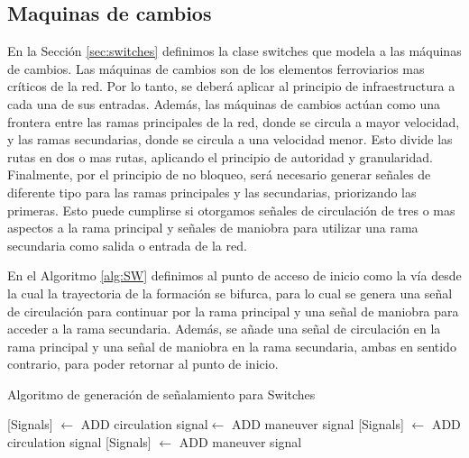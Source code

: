 \subsection{Maquinas de cambios}

    
    En la Sección \ref{sec:switches} definimos la clase switches que modela a las máquinas de cambios. Las máquinas de cambios son de los elementos ferroviarios mas críticos de la red. Por lo tanto, se deberá aplicar al principio de infraestructura a cada una de sus entradas. Además, las máquinas de cambios actúan como una frontera entre las ramas principales de la red, donde se circula a mayor velocidad, y las ramas secundarias, donde se circula a una velocidad menor. Esto divide las rutas en dos o mas rutas, aplicando el principio de autoridad y granularidad. Finalmente, por el principio de no bloqueo, será necesario generar señales de diferente tipo para las ramas principales y las secundarias, priorizando las primeras. Esto puede cumplirse si otorgamos señales de circulación de tres o mas aspectos a la rama principal y señales de maniobra para utilizar una rama secundaria como salida o entrada de la red.
    
    En el Algoritmo \ref{alg:SW} definimos al punto de acceso de inicio como la vía desde la cual la trayectoria de la formación se bifurca, para lo cual se genera una señal de circulación para continuar por la rama principal y una señal de maniobra para acceder a la rama secundaria. Además, se añade una señal de circulación en la rama principal y una señal de maniobra en la rama secundaria, ambas en sentido contrario, para poder retornar al punto de inicio. 
    
    \begin{algorithm}[hbt!]
        \caption{Algoritmo de generación de señalamiento para Switches}\label{alg:SW}
        \DontPrintSemicolon
        \SetNoFillComment
        \LinesNotNumbered 
        {
            {
                {
                    [Signals] $\gets$ ADD circulation signal\;
                    [Signals] $\gets$ ADD maneuver signal\;
                }
                {
                    [Signals] $\gets$ ADD circulation signal\;
                }
                {
                    [Signals] $\gets$ ADD maneuver signal\;
                }
            }   
        }
        \KwResult{[Signals]} 
    \end{algorithm}

